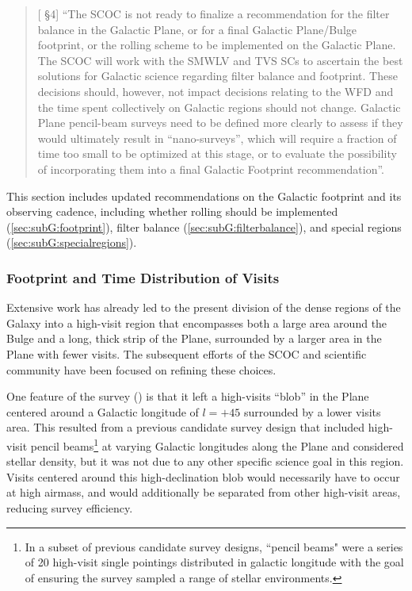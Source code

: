 \begin{quote}
    {[ \S4] ``The SCOC is not ready to finalize a recommendation for the filter balance in the Galactic Plane, or for a final Galactic Plane/Bulge footprint, or the rolling scheme to be implemented on the Galactic Plane. The SCOC will work with the SMWLV and TVS SCs to ascertain the best solutions for Galactic science regarding filter balance and footprint. These decisions should, however, not impact decisions relating to the WFD and the time spent collectively on Galactic regions should not change. Galactic Plane pencil-beam surveys need to be defined more clearly to assess if they would ultimately result in ``nano-surveys'', which will require a fraction of time too small to be optimized at this stage, or to evaluate the possibility of incorporating them into a final Galactic Footprint recommendation''.}
\end{quote}

This section includes updated recommendations on the Galactic footprint and its observing cadence, including whether rolling should be implemented (\autoref{sec:subG:footprint}), filter balance (\autoref{sec:subG:filterbalance}), and special regions (\autoref{sec:subG:specialregions}).

\subsubsection{Footprint and Time Distribution of Visits}\label{sec:subG:footprint}

Extensive work has already led to the present division of the dense regions of the Galaxy into a high-visit region that encompasses both a large area around the Bulge and a long, thick strip of the Plane, surrounded by a larger area in the Plane with fewer visits. %
The subsequent efforts of the SCOC and scientific community have been focused on refining these choices.

One feature of the  survey () is that it left a high-visits ``blob'' in the Plane centered around a Galactic longitude of $l=+45$ surrounded by a lower visits area. This resulted from a previous candidate survey design that included high-visit pencil beams\footnote{In a subset of previous candidate survey designs, ``pencil beams" were a series of 20 high-visit single pointings distributed in galactic longitude with the goal of ensuring the survey sampled a range of stellar environments.} at varying Galactic longitudes along the Plane and considered stellar density, but it was not due to any other specific science goal in this region. Visits centered around this high-declination blob would necessarily have to occur at high airmass, and would additionally be separated from other high-visit areas, reducing survey efficiency.

